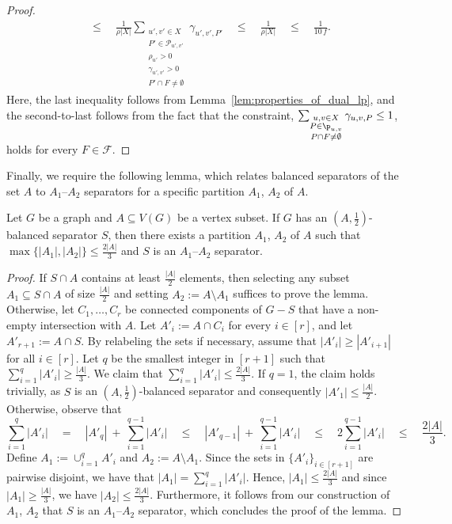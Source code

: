 \begin{proof}
\begin{align*}
        &\leq \quad \frac{1}{\rho |X|}\sum_{\substack{u',v'\in X\\ P' \in \mathcal{P}_{u',v'} \\ \rho_{u'} > 0\\ \gamma_{u',v'} > 0 \\ P' \cap F \neq \emptyset}} \gamma_{u',v',P'} \quad 
        \leq \quad \frac{1}{\rho |X|} \quad
        \leq \quad \frac{1}{10\,f}.
    \end{align*}
    Here, the last inequality follows from Lemma~\ref{lem:properties_of_dual_lp}, and the second-to-last follows from the fact that the constraint, $\sum_{\substack{u,v \in X\\ P\in \p_{u,v}\\ P\cap F\neq \emptyset}} \gamma_{u,v,P} \leq 1$, holds for every $F \in \mathcal{F}$.
\end{proof}

Finally, we require the following lemma, which relates balanced separators of the set $A$ to $A_1$--$A_2$ separators for a specific partition $A_1$, $A_2$ of $A$.

\begin{lemma}\label{lem:separation_vs_separators}
    Let $G$ be a graph and $A\subseteq V(G)$ be a vertex subset. If $G$ has an $(A,\frac{1}{2})$-balanced separator $S$, then there exists a partition $A_1$, $A_2$ of $A$ such that $\max\{|A_1|, |A_2|\} \leq \frac{2|A|}{3}$ and $S$ is an $A_1$--$A_2$ separator.
\end{lemma}
\begin{proof}
    If $S\cap A$ contains at least $\frac{|A|}{2}$ elements, then selecting any subset $A_1 \subseteq S\cap A$ of size $\frac{|A|}{2}$ and setting $A_2 := A \setminus A_1$ suffices to prove the lemma. Otherwise, let $C_1, \dots, C_r$ be connected components of $G-S$ that have a non-empty intersection with $A$. Let $A'_i := A \cap C_i$ for every $i \in [r]$, and let $A'_{r+1} := A \cap S$. By relabeling the sets if necessary, assume that $|A'_i| \geq |A'_{i+1}|$ for all $i \in [r]$. Let $q$ be the smallest integer in $[r+1]$ such that $\sum_{i=1}^{q}|A'_i| \geq \frac{|A|}{3}$. We claim that $\sum_{i=1}^{q}|A'_i| \leq \frac{2|A|}{3}$. If $q = 1$, the claim holds trivially, as $S$ is an $(A,\frac{1}{2})$-balanced separator and consequently $|A'_1|\leq \frac{|A|}{2}$. Otherwise, observe that
    $$
    \sum_{i=1}^{q}|A'_i| \quad
    = \quad |A'_{q}|\ +\ \sum_{i=1}^{q-1}|A'_i| \quad
    \leq \quad |A'_{q-1}|\ +\ \sum_{i=1}^{q-1}|A'_i| \quad
    \leq \quad 2\sum_{i=1}^{q-1}|A'_i| \quad
    \leq \quad \frac{2|A|}{3}.
    $$
    Define $A_1 := \cup_{i=1}^{q} A'_i$ and $A_2 := A\setminus A_1$. Since the sets in $\{A'_i\}_{i\in [r+1]}$ are pairwise disjoint, we have that $|A_1| = \sum_{i=1}^{q}|A'_i|$. Hence, $|A_1| \leq \frac{2|A|}{3}$ and since $|A_1| \geq \frac{|A|}{3}$, we have $|A_2| \leq \frac{2|A|}{3}$. Furthermore, it follows from our construction of $A_1$, $A_2$ that $S$ is an $A_1$--$A_2$ separator, which concludes the proof of the lemma.
\end{proof}

